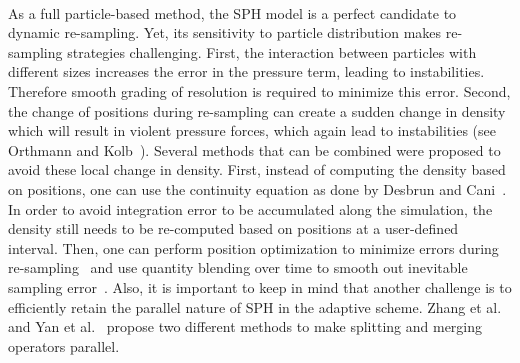 \paragraph*{}
As a full particle-based method, the SPH model is a perfect candidate to dynamic re-sampling. Yet, its sensitivity to particle distribution makes re-sampling strategies challenging. First, the interaction between particles with different sizes increases the error in the pressure term, leading to instabilities. Therefore smooth grading of resolution is required to minimize this error. Second, the change of positions during re-sampling can create a sudden change in density which will result in violent pressure forces, which again lead to instabilities (see Orthmann and Kolb~\cite{Orthmann2012}).
Several methods that can be combined were proposed to avoid these local change in density. First, instead of computing the density based on positions, one can use the continuity equation as done by Desbrun and Cani~\cite{Desbrun1999}. In order to avoid integration error to be accumulated along the simulation, the density still needs to be re-computed based on positions at a user-defined interval. Then, one can perform position optimization to minimize errors during re-sampling~\cite{Adams2007} and use quantity blending over time to smooth out inevitable sampling error~\cite{Orthmann2012}.
Also, it is important to keep in mind that another challenge is to efficiently retain the parallel nature of SPH in the adaptive scheme. Zhang et al.~\cite{Zhang2008} and Yan et al.~\cite{Yan2009} propose two different methods to make splitting and merging operators parallel.
